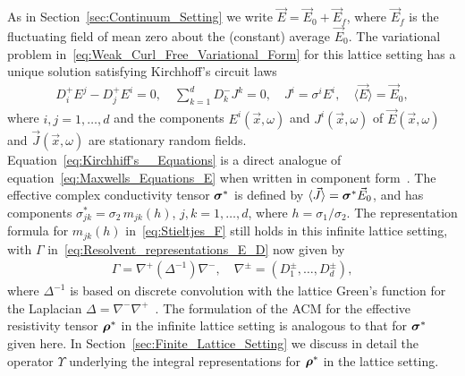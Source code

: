 \documentclass{cmslatex}
\newcommand\bsig{\mbox{\boldmath${\sigma}$}}
\newcommand\brho{\mbox{\boldmath${\rho}$}}
\begin{document}
As in Section~\ref{sec:Continuum_Setting} we write
$\vec{E}=\vec{E}_0+\vec{E}_f$, where $\vec{E}_f$ is the fluctuating
field of mean zero about the (constant) average $\vec{E}_0$. 
The variational problem in~\eqref{eq:Weak_Curl_Free_Variational_Form}
for this lattice setting has a unique solution satisfying Kirchhoff's
circuit laws~\cite{Golden:CMP-473,Bruno:JSP-365}      
%
\begin{align}\label{eq:Kirchhiff's__Equations}
  D_i^+E^j-D_j^+E^i=0, \quad
  \sum_{k=1}^dD_k^-J^k=0, \quad
  J^i=\sigma^iE^i, \quad
  \langle\vec{E}\rangle=\vec{E}_0,
\end{align}
%
where $i,j=1,\ldots,d$ and the components $E^i(\vec{x},\omega)$ and
$J^i(\vec{x},\omega)$ of $\vec{E}(\vec{x},\omega)$ and $\vec{J}(\vec{x},\omega)$ are
stationary random fields.  
Equation~\eqref{eq:Kirchhiff's__Equations} is a direct analogue of
equation~\eqref{eq:Maxwells_Equations_E} when written in component
form~\cite{Golden:CMP-473}. The effective complex 
conductivity tensor $\bsig^*$ is defined by
$\langle\vec{J}\rangle=\bsig^*\vec{E}_0$, and has components
$\sigma^*_{jk}=\sigma_2\,m_{jk}(h)$, $j,k=1,\ldots,d$, where $h=\sigma_1/\sigma_2$. The
representation formula for $m_{jk}(h)$ in~\eqref{eq:Stieltjes_F}
still holds in this infinite lattice setting,  
with $\Gamma$ in~\eqref{eq:Resolvent_representations_E_D} now given by 
%
\begin{align}\label{eq:Discrete_Gamma}
  \Gamma=\nabla^+(\Delta^{-1})\nabla^-, \quad \nabla^\pm = (D_1^\pm,\ldots,D_d^\pm),
\end{align}
%
where $\Delta^{-1}$ is based on discrete convolution with the lattice
Green's function for the Laplacian $\Delta=\nabla^-\nabla^+$~\cite{Bruno:JSP-365}. The
formulation of the ACM for the effective resistivity tensor $\brho^*$
in the infinite lattice setting is analogous to that for $\bsig^*$
given here. In Section~\ref{sec:Finite_Lattice_Setting} we discuss in
detail the operator $\Upsilon$ underlying the integral representations for
$\brho^*$ in the lattice setting. 
\end{document}
